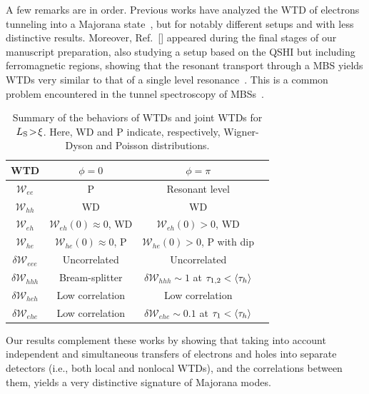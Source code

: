 \documentclass[aps,prl,amsmath,twocolumn,floatfix,superscriptaddress,longbibliography,footinbib]{revtex4-1}
\DeclarePairedDelimiter\mean{\langle}{\rangle}
\begin{document}
A few remarks are in order. Previous works have analyzed the WTD of electrons tunneling into a Majorana state~\cite{Chevallier2016,Mi2018,Fu2022}, but for notably different setups and with less distinctive results. 
Moreover, Ref.~[] appeared during the final stages of our manuscript preparation, also studying a setup based on the QSHI but including ferromagnetic regions, showing that the resonant transport through a MBS yields WTDs very similar to that of a single level resonance~\cite{Haack2014,Mi2018}. 
This is a common problem encountered in the tunnel spectroscopy of MBSs~\cite{Frolov2019,Frolov2021}. 
\begingroup
\squeezetable
\begin{table}[t!]
	\begin{tabular}{|c|c|c|c|}
		\hline %
		WTD &  $\phi\!=\!0$ &  $\phi\!=\!\pi$ \\ \hline 
		$\mathcal{W}_{ee}$ & P  & Resonant level \\  \hline 
		$\mathcal{W}_{hh}$ & WD  & WD \\ \hline 
		$\mathcal{W}_{eh}$ & $\mathcal{W}_{eh}(0)\approx 0$, WD & $\mathcal{W}_{eh}(0)> 0$, WD  \\ \hline 
		$\mathcal{W}_{he}$ & $\mathcal{W}_{he}(0)\approx 0$, P & $\mathcal{W}_{he}(0)> 0$, P with dip \\ \hline  \hline
		$\delta\mathcal{W}_{eee}$ & Uncorrelated  & Uncorrelated \\  \hline 
		$\delta\mathcal{W}_{hhh}$ & Bream-splitter & $\delta\mathcal{W}_{hhh}\sim 1$ at $\tau_{1,2}<\mean{\tau_h}$ \\  \hline 
		$\delta\mathcal{W}_{heh}$ & Low correlation  & Low correlation \\  \hline 
		$\delta\mathcal{W}_{ehe}$ & Low correlation & $\delta\mathcal{W}_{ehe}\sim0.1$ at $\tau_{1}<\mean{\tau_h}$ \\  \hline 
	\end{tabular}
	\caption{Summary of the behaviors of WTDs and joint WTDs for $L_{\rm S}\!>\!\xi$. Here, WD and P indicate, respectively, Wigner-Dyson and Poisson distributions. }
	\label{WTDs_All}
\end{table}
\endgroup
Our results complement these works by showing that taking into account independent and simultaneous transfers of electrons and holes into separate detectors (i.e., both local and nonlocal WTDs), and the correlations between them, yields a very distinctive signature of Majorana modes. 
\end{document}
